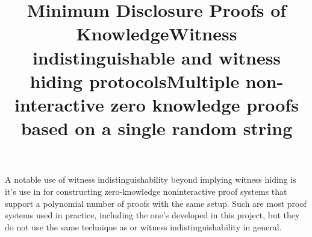 A notable use of witness indistinguishability beyond implying witness hiding is it's use in \cite{FLS90} for constructing zero-knowledge noninteractive proof systems that support a polynomial number of proofs with the same setup.
Such are most proof systems used in practice, including the one's developed in this project, but they do not use the same technique as \cite{FLS90} or witness indistinguishability in general.

\begin{references}
    \title{Minimum Disclosure Proofs of Knowledge}
    
    \title{Witness indistinguishable and witness hiding protocols}

    \title{Multiple non-interactive zero knowledge proofs based on a single random string}
\end{references}